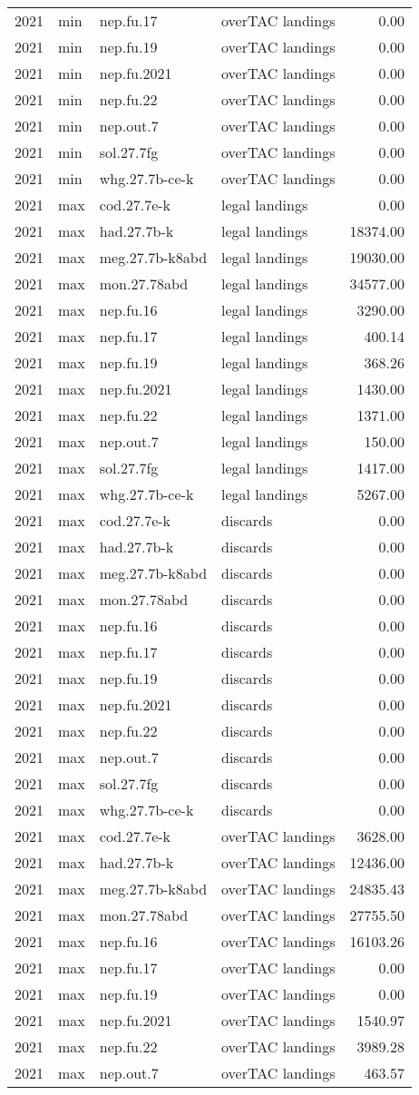 \documentclass[
]{article}
\begin{document}
\begin{longtable}[]{@{}llllr@{}}
2021 & min & nep.fu.17 & overTAC landings & 0.00\tabularnewline
2021 & min & nep.fu.19 & overTAC landings & 0.00\tabularnewline
2021 & min & nep.fu.2021 & overTAC landings & 0.00\tabularnewline
2021 & min & nep.fu.22 & overTAC landings & 0.00\tabularnewline
2021 & min & nep.out.7 & overTAC landings & 0.00\tabularnewline
2021 & min & sol.27.7fg & overTAC landings & 0.00\tabularnewline
2021 & min & whg.27.7b-ce-k & overTAC landings & 0.00\tabularnewline
2021 & max & cod.27.7e-k & legal landings & 0.00\tabularnewline
2021 & max & had.27.7b-k & legal landings & 18374.00\tabularnewline
2021 & max & meg.27.7b-k8abd & legal landings & 19030.00\tabularnewline
2021 & max & mon.27.78abd & legal landings & 34577.00\tabularnewline
2021 & max & nep.fu.16 & legal landings & 3290.00\tabularnewline
2021 & max & nep.fu.17 & legal landings & 400.14\tabularnewline
2021 & max & nep.fu.19 & legal landings & 368.26\tabularnewline
2021 & max & nep.fu.2021 & legal landings & 1430.00\tabularnewline
2021 & max & nep.fu.22 & legal landings & 1371.00\tabularnewline
2021 & max & nep.out.7 & legal landings & 150.00\tabularnewline
2021 & max & sol.27.7fg & legal landings & 1417.00\tabularnewline
2021 & max & whg.27.7b-ce-k & legal landings & 5267.00\tabularnewline
2021 & max & cod.27.7e-k & discards & 0.00\tabularnewline
2021 & max & had.27.7b-k & discards & 0.00\tabularnewline
2021 & max & meg.27.7b-k8abd & discards & 0.00\tabularnewline
2021 & max & mon.27.78abd & discards & 0.00\tabularnewline
2021 & max & nep.fu.16 & discards & 0.00\tabularnewline
2021 & max & nep.fu.17 & discards & 0.00\tabularnewline
2021 & max & nep.fu.19 & discards & 0.00\tabularnewline
2021 & max & nep.fu.2021 & discards & 0.00\tabularnewline
2021 & max & nep.fu.22 & discards & 0.00\tabularnewline
2021 & max & nep.out.7 & discards & 0.00\tabularnewline
2021 & max & sol.27.7fg & discards & 0.00\tabularnewline
2021 & max & whg.27.7b-ce-k & discards & 0.00\tabularnewline
2021 & max & cod.27.7e-k & overTAC landings & 3628.00\tabularnewline
2021 & max & had.27.7b-k & overTAC landings & 12436.00\tabularnewline
2021 & max & meg.27.7b-k8abd & overTAC landings &
24835.43\tabularnewline
2021 & max & mon.27.78abd & overTAC landings & 27755.50\tabularnewline
2021 & max & nep.fu.16 & overTAC landings & 16103.26\tabularnewline
2021 & max & nep.fu.17 & overTAC landings & 0.00\tabularnewline
2021 & max & nep.fu.19 & overTAC landings & 0.00\tabularnewline
2021 & max & nep.fu.2021 & overTAC landings & 1540.97\tabularnewline
2021 & max & nep.fu.22 & overTAC landings & 3989.28\tabularnewline
2021 & max & nep.out.7 & overTAC landings & 463.57\tabularnewline

\end{longtable}
\end{document}
